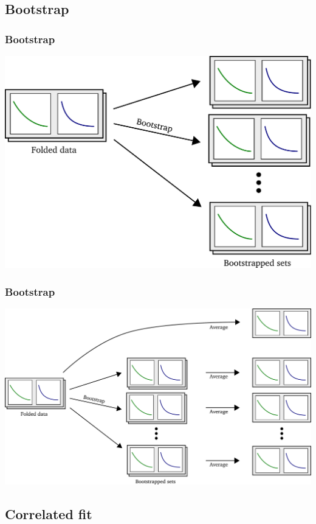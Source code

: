 \documentclass[english, fleqn]{beamer}
\begin{document}
\subsection{Bootstrap}

\begin{frame}
    \frametitle{Bootstrap}
    \includegraphics[scale=\scale]{sketches/03-bootstrap.pdf}
\end{frame}

\begin{frame}
    \frametitle{Bootstrap}
    \includegraphics[scale=\scale]{sketches/04-bootstrap.pdf}
\end{frame}

\subsection{Correlated fit}
\end{document}

